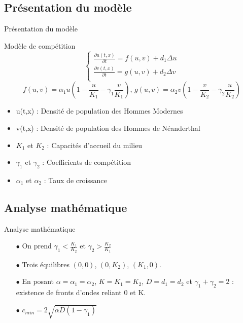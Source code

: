 \documentclass[10pt]{beamer}
\begin{document}
\subsection{Présentation du modèle}
\begin{frame}{Présentation du modèle}{}
\begin{block}{Modèle de compétition}
	$$\begin{cases} \frac{\partial u(t,x)}{\partial t} = f(u,v) + d_1\Delta u\\ \frac{\partial v(t,x)}{\partial t} = g(u,v) + d_2 \Delta v \\ 
\end{cases}$$
	$$f(u,v) = \alpha_1 u\left(1-\frac{u}{K_1}-\gamma_1\frac{v}{K_1}\right) \text{, } g(u,v) = \alpha_2 v\left(1-\frac{v}{K_2}-\gamma_2\frac{u}{K_2}\right)$$
\end{block}
\begin{itemize}
	\item u(t,x) : Densité de population des Hommes Modernes 
    \item v(t,x) : Densité de population des Hommes de Néanderthal 
    \item $K_1$ et $K_2$ : Capacités d'accueil du milieu
    \item $\gamma_1$ et $\gamma_2$ : Coefficients de compétition
    \item $\alpha_1$ et $\alpha_2$ : Taux de croissance
\end{itemize}
\end{frame}

\subsection{Analyse mathématique}
\begin{frame}{Analyse mathématique}{}
\begin{itemize}
\item[$\bullet$] On prend $\gamma_1 < \frac{K_1}{K_2}$ et $\gamma_2 > \frac{K_2}{K_1}$
\item[$\bullet$] Trois équilibres $(0,0)$, $(0,K_2)$, $(K_1,0)$.
\item[$\bullet$] En posant $\alpha = \alpha_1 = \alpha_2$, $K = K_1 = K_2$, $D = d_1 = d_2$ et $\gamma_1 + \gamma_2 = 2$ : existence de fronts d'ondes reliant 0 et K.
\item[$\bullet$] $c_{min} = 2 \sqrt{\alpha D(1-\gamma_1)}$
\end{itemize}
\end{frame}
\end{document}
